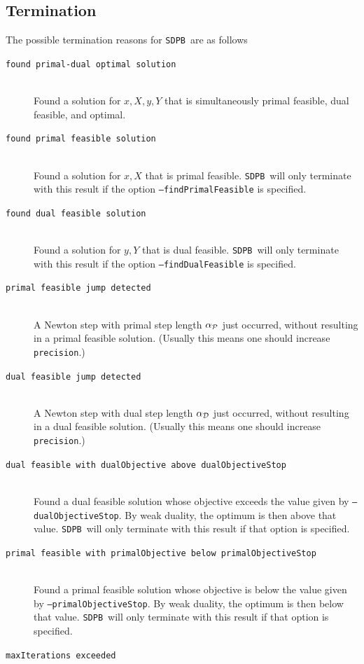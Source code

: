 \documentclass[12pt]{article}
\numberwithin{equation}{section}
\newcommand\SDPB{\texttt{SDPB}}
\begin{document}
\subsection{Termination}

The possible termination reasons for \SDPB\ are as follows
\begin{description}
\item[\texttt{found primal-dual optimal solution}] \hfill\\
Found a solution for $x,X,y,Y$ that is simultaneously primal feasible, dual feasible, and optimal.
\item[\texttt{found primal feasible solution}] \hfill\\
Found a solution for $x,X$ that is primal feasible.  \SDPB\ will only terminate with this result if the option \texttt{--findPrimalFeasible} is specified.
\item[\texttt{found dual feasible solution}] \hfill\\
Found a solution for $y,Y$ that is dual feasible.  \SDPB\ will only terminate with this result if the option \texttt{--findDualFeasible} is specified.
\item[\texttt{primal feasible jump detected}] \hfill\\
A Newton step with primal step length $\alpha_{\mathcal{P}}$ just occurred, without resulting in a primal feasible solution.  (Usually this means one should increase \texttt{precision}.)
\item[\texttt{dual feasible jump detected}] \hfill\\
A Newton step with dual step length $\alpha_{\mathcal{D}}$ just occurred, without resulting in a dual feasible solution.  (Usually this means one should increase \texttt{precision}.)
\item[\texttt{dual feasible with dualObjective above dualObjectiveStop}] \hfill\\
Found a dual feasible solution whose objective exceeds the value given by \texttt{--dualObjectiveStop}.  By weak duality, the optimum is then above that value.  \SDPB\ will only terminate with this result if that option is specified.
\item[\texttt{primal feasible with primalObjective below primalObjectiveStop}] \hfill\\
Found a primal feasible solution whose objective is below the value given by \texttt{--primalObjectiveStop}.  By weak duality, the optimum is then below that value.  \SDPB\ will only terminate with this result if that option is specified.
\item[\texttt{maxIterations exceeded}] \hfill\\

\end{description}
\end{document}

